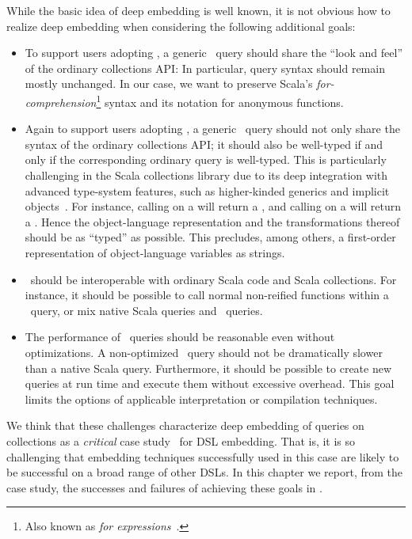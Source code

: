 While the basic idea of deep embedding is well known, it is not obvious how to realize deep embedding
when considering the following additional goals:

\begin{itemize}
\item To support users adopting \LoS, a generic \LoS\ query should share the ``look and feel'' of the ordinary collections API: In particular, query syntax should remain mostly unchanged. In our case, we want to preserve  Scala's \emph{for-comprehension}\footnote{Also known as \emph{for expressions}~\citep[Ch.~23]{Odersky11book}.} syntax and its notation
 for anonymous functions.
 \item Again to support users adopting \LoS, a generic \LoS\ query should not only share the syntax of the ordinary collections API; it should also be well-typed if and only if the corresponding ordinary query is well-typed.
 This is particularly challenging in the Scala collections
 library due to its deep integration with advanced type-system features, such as higher-kinded generics
 and implicit objects~\citep{odersky2009fighting}. For instance, calling  on a  will return a , and calling  on a 
 will return a . Hence the object-language representation and the
 transformations thereof should be as ``typed'' as possible. This precludes, among others, a first-order
 representation of object-language variables as strings.
 \item \LoS\ should be interoperable with ordinary Scala code and Scala collections. For instance, it should
 be possible to call normal non-reified functions within a \LoS\ query, or mix native Scala queries and \LoS\ queries.
 \item The performance of \LoS\ queries should be reasonable even without optimizations. A non-optimized \LoS\ query
 should not be dramatically slower than a native Scala query. Furthermore, it should be possible to create new queries at run time and execute them without excessive overhead.
 This goal limits the options of applicable interpretation or compilation techniques.
\end{itemize}
 
We think that these challenges characterize deep embedding of queries on collections as a \emph{critical} case study~\citep{flyvbjerg06five} for DSL embedding.
That is, it is so challenging that embedding techniques successfully used in this case are likely to be successful on a broad range of other DSLs.
In this chapter we report, from the case study, the successes and failures of achieving these goals in \LoS.
